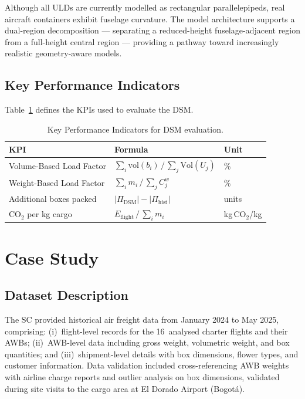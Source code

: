 \documentclass[12pt,a4paper]{article}
\begin{document}
Although all ULDs are currently modelled as rectangular
parallelepipeds, real aircraft containers exhibit fuselage curvature.
The model architecture supports a dual-region decomposition ---
separating a reduced-height fuselage-adjacent region from a full-height
central region --- providing a pathway toward increasingly realistic
geometry-aware models.

\subsection{Key Performance Indicators}

Table~\ref{tab:kpis} defines the KPIs used to evaluate the DSM.

\begin{table}[htbp]
\caption{Key Performance Indicators for DSM evaluation.}
\label{tab:kpis}
\centering
\begin{tabular}{@{}lll@{}}
\toprule
\textbf{KPI} & \textbf{Formula} & \textbf{Unit} \\
\midrule
Volume-Based Load Factor &
  $\sum_i\mathrm{vol}(b_i)\,/\,\sum_j\mathrm{Vol}(U_j)$ & \% \\[3pt]
Weight-Based Load Factor &
  $\sum_i m_i\,/\,\sum_j C_j^w$ & \% \\[3pt]
Additional boxes packed &
  $|\Pi_\mathrm{DSM}|-|\Pi_\mathrm{hist}|$ & units \\[3pt]
CO$_2$ per kg cargo &
  $E_\mathrm{flight}\,/\,\sum_i m_i$ & kg\,CO$_2$/kg \\
\bottomrule
\end{tabular}
\end{table}


\section{Case Study}
\label{sec:casestudy}

\subsection{Dataset Description}

The SC provided historical air freight data from January 2024 to
May 2025, comprising: (i)~flight-level records for the 16~analysed
charter flights and their AWBs; (ii)~AWB-level data including gross
weight, volumetric weight, and box quantities; and
(iii)~shipment-level details with box dimensions, flower types, and
customer information.
Data validation included cross-referencing AWB weights with airline
charge reports and outlier analysis on box dimensions, validated
during site visits to the cargo area at El Dorado Airport
(Bogot\'{a}).
\end{document}
